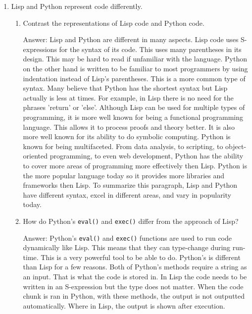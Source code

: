 \documentclass[12pt,letterpaper]{ntdhw}
\begin{document}
\begin{enumerate}
  \item Lisp and Python represent code differently.

  \begin{enumerate}
    \item Contrast the representations of Lisp code and Python code.

    \begin{emph}
      Answer: Lisp and Python are different in many aspects. Lisp code uses S-expressions for the syntax of its code. This uses many parentheses in its design. This may be hard to read if unfamiliar with the language.         Python on the other hand is written to be familiar to most programmers by using indentation instead of Lisp's parentheses. This is a more common type of syntax. Many believe that Python has the shortest syntax but 
      Lisp actually is less at times. For example, in Lisp there is no need for the phrases 'return' or 'else'. Although Lisp can be used for multiple types of programming, it is more well known for being a functional 
      programming language. This allows it to process proofs and theory better. It is also more well known for its ability to do symbolic computing. Python is known for being multifaceted. From data analysis, to 
      scripting, to object-oriented programming, to even web development, Python has the ability to cover more areas of programming more effectively then Lisp. Python is the more popular language today so it provides 
      more libraries and frameworks then Lisp. To summarize this paragraph, Lisp and Python have different syntax, excel in different areas, and vary in popularity today. 
    \end{emph}

    \item How do Python's {\tt eval()} and {\tt exec()} differ from
    the approach of Lisp?

    \begin{emph}
      Answer: Python's {\tt eval()} and {\tt exec()} functions are used to run code dynamically like Lisp. This means that they can type-change during run-time. This is a very powerful tool to be able to do. Python's is 
      different than Lisp for a few reasons. Both of Python's methods require a string as an input. That is what the code is stored in. In Lisp the code needs to be written in an S-expression but the type does not 
      matter. When the code chunk is ran in Python, with these methods, the output is not outputted automatically. Where in Lisp, the output is shown after execution. 
    \end{emph}
  \end{enumerate}


\end{enumerate}
\end{document}
